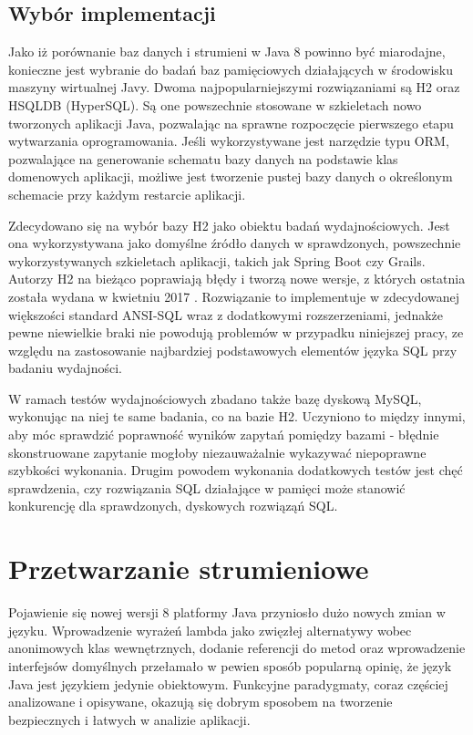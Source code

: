 \documentclass[12pt,twoside,openright]{extarticle}
\let\oldsection\section%
\renewcommand{\section}{\cleardoublepage\oldsection}%
\begin{document}
\subsection{Wybór implementacji}

    Jako iż porównanie baz danych i strumieni w Java 8 powinno być miarodajne, konieczne jest wybranie do badań baz pamięciowych działających w środowisku maszyny wirtualnej Javy. Dwoma najpopularniejszymi rozwiązaniami są H2 oraz HSQLDB (HyperSQL). Są one powszechnie stosowane w szkieletach nowo tworzonych aplikacji Java, pozwalając na sprawne rozpoczęcie pierwszego etapu wytwarzania oprogramowania. Jeśli wykorzystywane jest narzędzie typu ORM, pozwalające na generowanie schematu bazy danych na podstawie klas domenowych aplikacji, możliwe jest tworzenie pustej bazy danych o określonym schemacie przy każdym restarcie aplikacji. 
    
    Zdecydowano się na wybór bazy H2 jako obiektu badań wydajnościowych. Jest ona wykorzystywana jako domyślne źródło danych w sprawdzonych, powszechnie wykorzystywanych szkieletach aplikacji, takich jak Spring Boot czy Grails. Autorzy H2 na bieżąco poprawiają błędy i tworzą nowe wersje, z których ostatnia została wydana w kwietniu 2017 \cite{h2maven}. Rozwiązanie to implementuje w zdecydowanej większości standard ANSI-SQL wraz z dodatkowymi rozszerzeniami, jednakże pewne niewielkie braki nie powodują problemów w przypadku niniejszej pracy, ze względu na zastosowanie najbardziej podstawowych elementów języka SQL przy badaniu wydajności.

    W ramach testów wydajnościowych zbadano także bazę dyskową MySQL, wykonując na niej te same badania, co na bazie H2. Uczyniono to między innymi, aby móc sprawdzić poprawność wyników zapytań pomiędzy bazami - błędnie skonstruowane zapytanie mogłoby niezauważalnie wykazywać niepoprawne szybkości wykonania. Drugim powodem wykonania dodatkowych testów jest chęć sprawdzenia, czy rozwiązania SQL działające w pamięci może stanowić konkurencję dla sprawdzonych, dyskowych rozwiąząń SQL.

\section{Przetwarzanie strumieniowe}

    Pojawienie się nowej wersji 8 platformy Java przyniosło dużo nowych zmian w języku. Wprowadzenie wyrażeń lambda jako zwięzłej alternatywy wobec anonimowych klas wewnętrznych, dodanie referencji do metod oraz wprowadzenie interfejsów domyślnych przełamało w pewien sposób popularną opinię, że język Java jest językiem jedynie obiektowym. Funkcyjne paradygmaty, coraz częściej analizowane i opisywane, okazują się dobrym sposobem na tworzenie bezpiecznych i łatwych w analizie aplikacji. 
\end{document}
